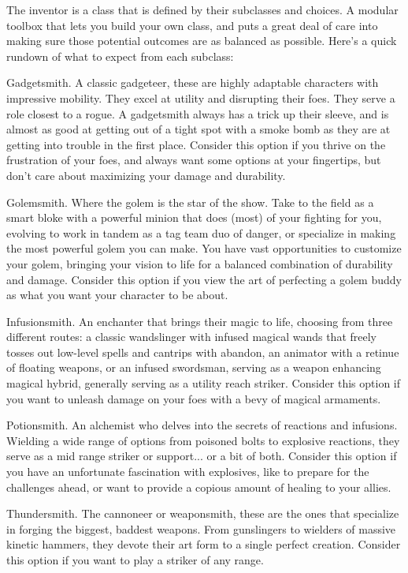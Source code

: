 \documentclass[11pt,twoside,openany]{book}  %
\begin{document}
The inventor is a class that is defined by their subclasses and choices. A modular toolbox that lets you build your own class, and puts a great deal of care into making sure those potential outcomes are as balanced as possible. Here’s a quick rundown of what to expect from each subclass:
\begin{fiveitemize}
	\item Gadgetsmith. A classic gadgeteer, these are highly adaptable characters with impressive mobility. They excel at utility and disrupting their foes. They serve a role closest to a rogue. A gadgetsmith always has a trick up their sleeve, and is almost as good at getting out of a tight spot with a smoke bomb as they are at getting into trouble in the first place. Consider this option if you thrive on the frustration of your foes, and always want some options at your fingertips, but don’t care about maximizing your damage and durability.
	\item Golemsmith. Where the golem is the star of the show. Take to the field as a smart bloke with a powerful minion that does (most) of your fighting for you, evolving to work in tandem as a tag team duo of danger, or specialize in making the most powerful golem you can make. You have vast opportunities to customize your golem, bringing your vision to life for a balanced combination of durability and damage. Consider this option if you view the art of perfecting a golem buddy as what you want your character to be about.
	\item Infusionsmith. An enchanter that brings their magic to life, choosing from three different routes: a classic wandslinger with infused magical wands that freely tosses out low-level spells and cantrips with abandon, an animator with a retinue of floating weapons, or an infused swordsman, serving as a weapon enhancing magical hybrid, generally serving as a utility reach striker. Consider this option if you want to unleash damage on your foes with a bevy of magical armaments.
	\item Potionsmith. An alchemist who delves into the secrets of reactions and infusions. Wielding a wide range of options from poisoned bolts to explosive reactions, they serve as a mid range striker or support... or a bit of both. Consider this option if you have an unfortunate fascination with explosives, like to prepare for the challenges ahead, or want to provide a copious amount of healing to your allies.
	\item Thundersmith. The cannoneer or weaponsmith, these are the ones that specialize in forging the biggest, baddest weapons. From gunslingers to wielders of massive kinetic hammers, they devote their art form to a single perfect creation. Consider this option if you want to play a striker of any range.

\end{fiveitemize}
\end{document}
